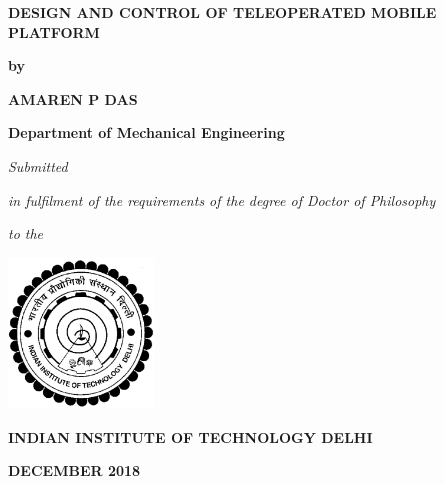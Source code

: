 \newpage
\thispagestyle{empty}
\begin{center}



\textbf{\large{DESIGN AND CONTROL OF TELEOPERATED MOBILE PLATFORM}}

\bigskip
\bigskip
\bigskip
\bigskip
\bigskip
\bigskip
\textbf{by}
\bigskip
\bigskip

\textbf{AMAREN P DAS}

\bigskip
\bigskip

\textbf{Department of Mechanical Engineering}

\bigskip
\bigskip
\bigskip
\bigskip
\bigskip
\bigskip


\textit{Submitted}

\textit{in fulfilment of the requirements of the degree of Doctor of Philosophy}

\bigskip
\bigskip

\textbf{}

\bigskip
\bigskip

\textit{to the}

\bigskip
\bigskip
\bigskip
\bigskip
\bigskip
\bigskip
\bigskip

\includegraphics[height=4cm]{Misc_front/iitlogo.eps}

\bigskip
\bigskip



\textbf{INDIAN INSTITUTE OF TECHNOLOGY DELHI}


\textbf{DECEMBER 2018}
\end{center}
\mbox{}
\restoregeometry